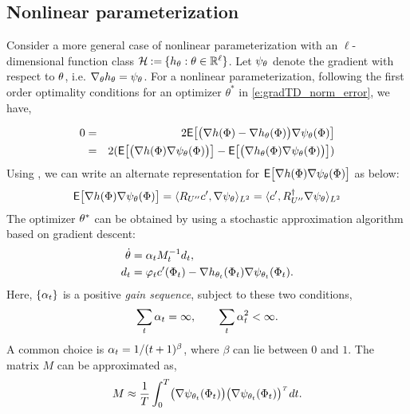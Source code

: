 \subsection{Nonlinear parameterization}
Consider a more general case of nonlinear parameterization with an $\ell$- dimensional function class ${\cal H} \mathbin{:=} \{h_\theta : \theta \in \mathbb{R}^\ell\}$. Let $\psi_\theta$ denote the gradient with respect to $\theta$, i.e. $\nabla_\theta h_\theta = \psi_\theta$. For a nonlinear parameterization, following the first order optimality conditions for an optimizer $\theta^{*}$ in \eqref{e:gradTD_norm_error}, we have,

\begin{eqnarray*}
	0 & = &2 {\sf E} \bigl[\bigl(\nabla h(\Phi) - \nabla h_\theta (\Phi)\bigr) \nabla \psi_\theta (\Phi)\bigr]\\
	& = & 2 ({\sf E} \bigl[\bigl(\nabla h(\Phi)\nabla \psi_\theta (\Phi)\bigr)\bigr] - {\sf E} \bigl[\bigl(\nabla h_\theta (\Phi)\nabla \psi_\theta (\Phi)\bigr)\bigr])
\end{eqnarray*}
Using , we can write an alternate representation for ${\sf E} \bigl[ \nabla h(\Phi)\nabla \psi_\theta (\Phi)\bigr]$ as below:
\begin{eqnarray*}
	{\sf E}\bigl[\nabla h(\Phi)\nabla \psi_\theta (\Phi)\bigr]=\langle R_{U''}c',\nabla \psi_\theta\rangle_{L^2} =\langle c', R_{U''}^\dagger \nabla \psi_\theta\rangle_{L^2}
\end{eqnarray*}
The optimizer $\theta^*$ can be obtained by using a stochastic approximation algorithm based on gradient descent: 
\begin{equation*}
\begin{aligned}
\dot{\theta}&=\alpha_t M_{t}^{-1} d_t, \\ 
d_t & =\varphi_t  c'(\Phi_t)-\nabla h_{\theta_{t}}(\Phi_t)\nabla \psi_{\theta_{t}}(\Phi_t).
\end{aligned}
\end{equation*}
Here, $\{\alpha_t\}$ is a positive \textit{gain sequence}, subject to these two conditions, 
\begin{equation}
\sum_t \alpha_t = \infty, \qquad \sum_t \alpha_t^2 < \infty.
\end{equation}
A common choice is $\alpha_t = 1/(t+1)^\beta$, where $\beta$ can lie between $0$ and $1$. The matrix $M$ can be approximated as,
\begin{equation}
M \approx \frac{1}{T}\int_0^T\bigl(\gradbasis_{\param_t}(\markovstate_t)\bigr)\bigl(\gradbasis_{\param_t}(\markovstate_t)\bigr)^{\transpose}\, dt.
\label{e:gradTD_M_int}
\end{equation}

